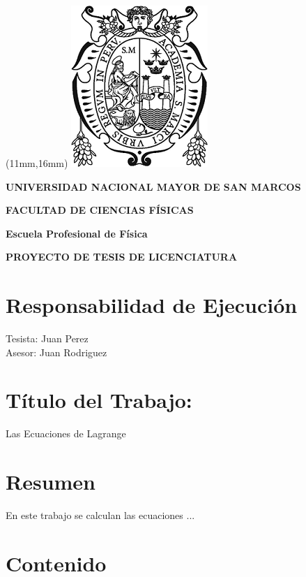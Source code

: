 \documentclass[spanish,a4paper,11pt]{article}
\begin{document}
\thispagestyle{empty}

\addtolength{\topmargin}{-1cm}
\addtolength{\headsep}{-1cm}
\enlargethispage{0.5cm}
\addtolength{\footskip}{0.5cm}

\begin{textblock*}{297mm}(11mm,16mm)
	\includegraphics[scale=0.28]{unmsm-logo}
\end{textblock*}

\par
\centerline{\large \textbf{UNIVERSIDAD NACIONAL MAYOR DE SAN MARCOS}}
\vspace{8pt}
\centerline{\large\textbf{FACULTAD DE CIENCIAS FÍSICAS}}
\vspace{8pt}
\centerline{\large\textbf{Escuela Profesional de Física}}
\vspace{8pt}
\centerline{\large\textbf{PROYECTO DE TESIS DE LICENCIATURA }}
\vspace{10pt}


\section{Responsabilidad de Ejecución} \noindent 
Tesista: Juan Perez \\
Asesor: Juan Rodriguez  \\


\section{Título del Trabajo:} \noindent 
Las Ecuaciones de Lagrange  

\section{Resumen } \noindent 
En este trabajo se calculan las ecuaciones ...

\section{Contenido} 
\end{document}
